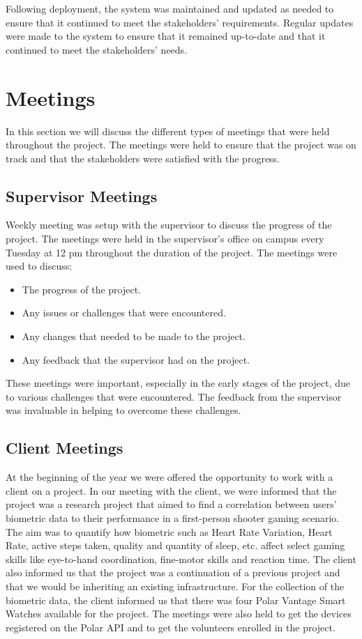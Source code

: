 Following deployment, the system was maintained and updated as needed to ensure that it continued to meet the stakeholders' requirements. Regular updates
were made to the system to ensure that it remained up-to-date and that it continued to meet the stakeholders' needs.

\section{Meetings}
In this section we will discuss the different types of meetings that were held throughout the project. The meetings were held to ensure that the project was on track
and that the stakeholders were satisfied with the progress.

\subsection{Supervisor Meetings}
Weekly meeting was setup with the supervisor to discuss the progress of the project. The meetings were held in the supervisor's office on campus every Tuesday at 12 pm throughout
the duration of the project. The meetings were used to discuss:

\begin{itemize}
    \item The progress of the project.
    \item Any issues or challenges that were encountered.
    \item Any changes that needed to be made to the project.
    \item Any feedback that the supervisor had on the project.
\end{itemize}

These meetings were important, especially in the early stages of the project, due to various challenges that were encountered. The feedback from the supervisor was invaluable
in helping to overcome these challenges.

\subsection{Client Meetings}

At the beginning of the year we were offered the opportunity to work with a client on a project. In our meeting with the client, we were informed that the project
was a research project that aimed to find a correlation between users' biometric data to their performance in a first-person shooter gaming scenario. The aim was to quantify
how biometric such as Heart Rate Variation, Heart Rate, active steps taken, quality and quantity of sleep, etc. affect select gaming skills like eye-to-hand coordination, fine-motor skills and reaction time.
The client also informed us that the project was a continuation of a previous project and that we would be inheriting an existing infrastructure. 
For the collection of the biometric data, the client informed us that there was four Polar Vantage Smart Watches available for the project. The meetings were also held to get
the devices registered on the Polar API and to get the volunteers enrolled in the project. 

